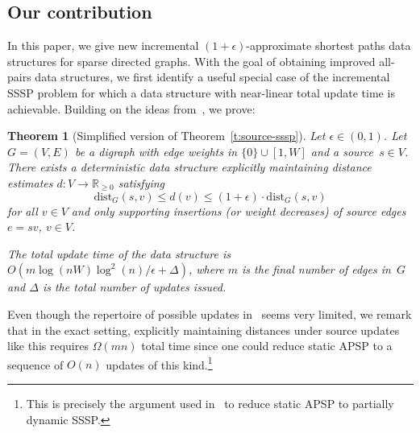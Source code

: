 \documentclass[11pt,letterpaper]{article}
\theoremstyle{plain}
\newtheorem{theorem}{Theorem}[section]
\newcommand{\eps}{\ensuremath{\epsilon}}
\newcommand{\dist}{\mathrm{dist}}
\begin{document}
\subsection{Our contribution}
In this paper, we give new incremental $(1+\eps)$-approximate shortest paths data structures for sparse directed graphs.
With the goal of obtaining improved all-pairs data structures, we first identify a useful special case of the incremental SSSP problem for which a data structure with near-linear total update time is achievable.
Building on the ideas from~\cite{ChechikZ21,KyngMG22}, we prove:
\begin{theorem}[Simplified version of Theorem~\ref{t:source-sssp}]\label{t:source-sssp-intro}
Let $\eps\in (0,1)$. Let $G=(V,E)$ be a digraph with edge weights in ${\{0\}\cup [1,W]}$ and a source~$s\in V$. There exists a deterministic data structure explicitly maintaining distance estimates $d:V\to\mathbb{R}_{\geq 0}$ satisfying
\[ \dist_G(s,v)\leq d(v)\leq (1+\eps)\cdot\dist_G(s,v) \]
for all $v\in V$ and only supporting insertions (or weight decreases) of \emph{source edges} $e=sv$, $v\in V$.

The total update time of the data structure
  is $O(m\log{(nW)}\log^2(n)/\eps+\Delta)$, where $m$ is the final number of edges in~$G$
and $\Delta$ is the total number of updates issued.
\end{theorem}
Even though the repertoire of possible updates in~ seems very limited, we remark that in the exact setting, explicitly maintaining distances under source updates like this requires $\Omega(mn)$ total time since one could reduce static APSP to a sequence of $O(n)$ updates of this kind.\footnote{This is precisely the argument used in~\cite{RodittyZ11} to reduce static APSP to partially dynamic SSSP.}
\end{document}
